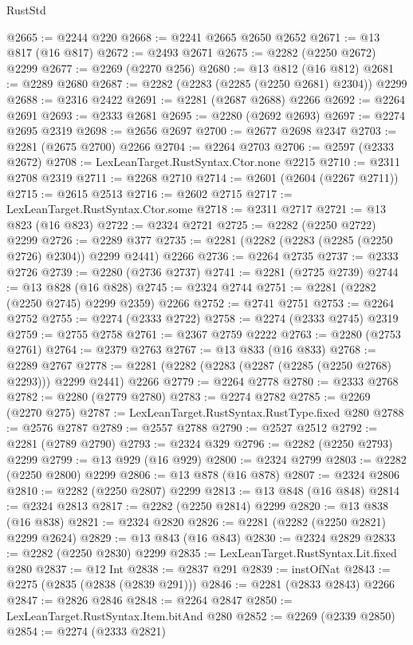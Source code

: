 \begin{lexlean}{RustStd}
\begin{coremodule}
@2665 := @2244 @220
@2668 := @2241 @2665 @2650 @2652
@2671 := @13 @817 (@16 @817)
@2672 := @2493 @2671
@2675 := @2282 (@2250 @2672) @2299
@2677 := @2269 (@2270 @256)
@2680 := @13 @812 (@16 @812)
@2681 := @2289 @2680
@2687 := @2282 (@2283 (@2285 (@2250 @2681) @2304)) @2299
@2688 := @2316 @2422
@2691 := @2281 (@2687 @2688) @2266
@2692 := @2264 @2691
@2693 := @2333 @2681
@2695 := @2280 (@2692 @2693)
@2697 := @2274 @2695 @2319
@2698 := @2656 @2697
@2700 := @2677 @2698 @2347
@2703 := @2281 (@2675 @2700) @2266
@2704 := @2264 @2703
@2706 := @2597 (@2333 @2672)
@2708 := LexLeanTarget.RustSyntax.Ctor.none @2215
@2710 := @2311 @2708 @2319
@2711 := @2268 @2710
@2714 := @2601 (@2604 (@2267 @2711))
@2715 := @2615 @2513
@2716 := @2602 @2715
@2717 := LexLeanTarget.RustSyntax.Ctor.some
@2718 := @2311 @2717
@2721 := @13 @823 (@16 @823)
@2722 := @2324 @2721
@2725 := @2282 (@2250 @2722) @2299
@2726 := @2289 @377
@2735 := @2281 (@2282 (@2283 (@2285 (@2250 @2726) @2304)) @2299 @2441) @2266
@2736 := @2264 @2735
@2737 := @2333 @2726
@2739 := @2280 (@2736 @2737)
@2741 := @2281 (@2725 @2739)
@2744 := @13 @828 (@16 @828)
@2745 := @2324 @2744
@2751 := @2281 (@2282 (@2250 @2745) @2299 @2359) @2266
@2752 := @2741 @2751
@2753 := @2264 @2752
@2755 := @2274 (@2333 @2722)
@2758 := @2274 (@2333 @2745) @2319
@2759 := @2755 @2758
@2761 := @2367 @2759 @2222
@2763 := @2280 (@2753 @2761)
@2764 := @2379 @2763
@2767 := @13 @833 (@16 @833)
@2768 := @2289 @2767
@2778 := @2281 (@2282 (@2283 (@2287 (@2285 (@2250 @2768) @2293))) @2299 @2441) @2266
@2779 := @2264 @2778
@2780 := @2333 @2768
@2782 := @2280 (@2779 @2780)
@2783 := @2274 @2782
@2785 := @2269 (@2270 @275)
@2787 := LexLeanTarget.RustSyntax.RustType.fixed @280
@2788 := @2576 @2787
@2789 := @2557 @2788
@2790 := @2527 @2512
@2792 := @2281 (@2789 @2790)
@2793 := @2324 @329
@2796 := @2282 (@2250 @2793) @2299
@2799 := @13 @929 (@16 @929)
@2800 := @2324 @2799
@2803 := @2282 (@2250 @2800) @2299
@2806 := @13 @878 (@16 @878)
@2807 := @2324 @2806
@2810 := @2282 (@2250 @2807) @2299
@2813 := @13 @848 (@16 @848)
@2814 := @2324 @2813
@2817 := @2282 (@2250 @2814) @2299
@2820 := @13 @838 (@16 @838)
@2821 := @2324 @2820
@2826 := @2281 (@2282 (@2250 @2821) @2299 @2624)
@2829 := @13 @843 (@16 @843)
@2830 := @2324 @2829
@2833 := @2282 (@2250 @2830) @2299
@2835 := LexLeanTarget.RustSyntax.Lit.fixed @280
@2837 := @12 Int
@2838 := @2837 @291
@2839 := instOfNat
@2843 := @2275 (@2835 (@2838 (@2839 @291)))
@2846 := @2281 (@2833 @2843) @2266
@2847 := @2826 @2846
@2848 := @2264 @2847
@2850 := LexLeanTarget.RustSyntax.Item.bitAnd @280
@2852 := @2269 (@2339 @2850)
@2854 := @2274 (@2333 @2821)

\end{coremodule}
\end{lexlean}
